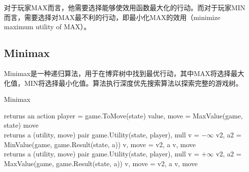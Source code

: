 对于玩家MAX而言，他需要选择能够使效用函数最大化的行动。而对于玩家MIN而言，需要选择对MAX最不利的行动，即最小化MAX的效用（minimize maximum utility of MAX）。\\

\subsection{Minimax}

Minimax是一种递归算法，用于在博弈树中找到最优行动，其中MAX将选择最大化值，MIN将选择最小化值。算法执行深度优先搜索算法以探索完整的游戏树。\\

\begin{algorithm}[H]
    \caption{Minimax}
    \begin{algorithmic}[1]
         returns an action
        \State player = game.ToMove(state)
        \State value, move = MaxValue(game, state)
        \State \Return move
        \EndProcedure
        \\
         returns a (utility, move) pair
        \Return game.Utility(state, player), null
        \EndIf
        \State v = $ - \infty $
        \State v2, a2 = MinValue(game, game.Result(state, a))
        \State v, move = v2, a
        \EndIf
        \EndFor
        \State \Return v, move
        \EndProcedure
        \\
         returns a (utility, move) pair
        \Return game.Utility(state, player), null
        \EndIf
        \State v = $ + \infty $
        \State v2, a2 = MaxValue(game, game.Result(state, a))
        \State v, move = v2, a
        \EndIf
        \EndFor
        \State \Return v, move
        \EndProcedure
    \end{algorithmic}
\end{algorithm}


